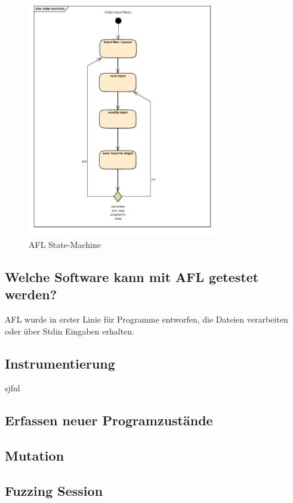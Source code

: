 \documentclass[12pt,a4paper]{scrreprt}
\begin{document}
\begin{figure}[htbp] 
  \centering
     \includegraphics[width=0.75\textwidth]{state_machine.png}
  \caption{AFL State-Machine}
  \label{fig:Bild0}
\end{figure}




\subsection{Welche Software kann mit AFL getestet werden?}
AFL wurde in erster Linie für Programme entworfen, die Dateien verarbeiten oder über Stdin Eingaben erhalten. 

\newpage
\subsection{Instrumentierung}	
sjfnl

\subsection{Erfassen neuer Programzustände}

\subsection{Mutation}

\subsection{Fuzzing Session}
\end{document}
